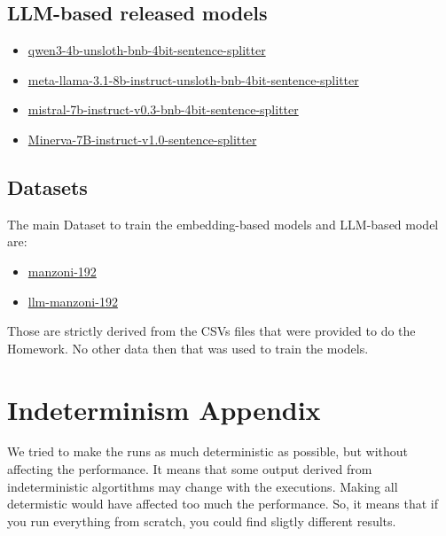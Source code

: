 \documentclass[11pt]{article}
\begin{document}
\subsection{LLM-based released models}

\begin{itemize}
	\item 
	\href{https://huggingface.co/fax4ever/qwen3-4b-unsloth-bnb-4bit-sentence-splitter}{qwen3-4b-unsloth-bnb-4bit-sentence-splitter}
	\item 
	\href{https://huggingface.co/fax4ever/meta-llama-3.1-8b-instruct-unsloth-bnb-4bit-sentence-splitter}{meta-llama-3.1-8b-instruct-unsloth-bnb-4bit-sentence-splitter}
	\item \href{https://huggingface.co/fax4ever/mistral-7b-instruct-v0.3-bnb-4bit-sentence-splitter}{mistral-7b-instruct-v0.3-bnb-4bit-sentence-splitter}
	\item \href{https://huggingface.co/fax4ever/Minerva-7B-instruct-v1.0-sentence-splitter}{Minerva-7B-instruct-v1.0-sentence-splitter}
\end{itemize}

\subsection{Datasets}

The main Dataset to train the embedding-based models and LLM-based model are:

\begin{itemize}
	\item \href{https://huggingface.co/datasets/fax4ever/manzoni-192}{manzoni-192}
	\item \href{https://huggingface.co/datasets/fax4ever/llm-manzoni-192}{llm-manzoni-192}
\end{itemize}

Those are strictly derived from the CSVs files that were provided to do the Homework.
No other data then that was used to train the models.

\section{Indeterminism Appendix}
\label{sec:appendix3}

We tried to make the runs as much deterministic as possible, but without affecting the
performance.
It means that some output derived from indeterministic algortithms may change with the executions.
Making all determistic would have affected too much the performance.
So, it means that if you run everything from scratch, you could find sligtly different results.
\end{document}
